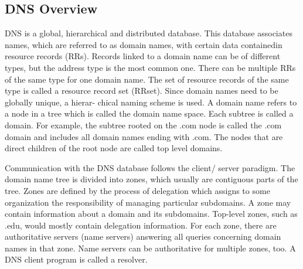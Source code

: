 \documentclass[12pt]{article}
\begin{document}
\subsection*{DNS Overview}
DNS is a global, hierarchical and distributed database. This database associates names, which
are referred to as domain names, with certain data containedin resource records (RRs). Records linked to a domain name can be of different types, but the address type is the most
common one. There can be multiple RRs of the same type
for one domain name. The set of resource records of the
same type is called a resource record set (RRset).
Since domain names need to be globally unique, a hierar-
chical naming scheme is used. A domain name refers to a
node in a tree which is called the domain name
space. Each subtree is called a
domain. For example, the subtree rooted on the .com node
is called the .com domain and includes all domain names
ending with .com. The nodes that are direct children of the
root node are called top level domains.

Communication with the DNS database follows the client/
server paradigm. The domain name tree is divided into
zones, which usually are contiguous parts of the tree. Zones
are defined by the process of delegation which assigns to
some organization the responsibility of managing particular
subdomains. A zone may contain information about a domain and its subdomains. Top-level zones, such as .edu,
would mostly contain delegation information.
For each zone, there are authoritative servers (name servers)
answering all queries concerning domain names in that zone.
Name servers can be authoritative for multiple zones, too.
A DNS client program is called a resolver. 
\end{document}
